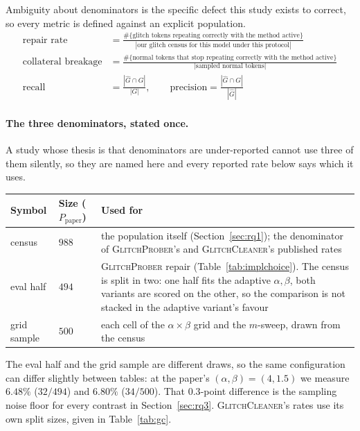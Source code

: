\documentclass[11pt,a4paper]{article}
\newcommand{\gp}{\textsc{GlitchProber}}
\newcommand{\gc}{\textsc{GlitchCleaner}}
\newcommand{\Ppaper}{$P_{\mathrm{paper}}$}
\begin{document}
Ambiguity about denominators is the specific defect this study exists to correct,
so every metric is defined against an explicit population.
\begin{align*}
\text{repair rate} &= \frac{\#\{\text{glitch tokens repeating correctly with the method active}\}}{|\text{our glitch census for this model under this protocol}|}\\[0.3em]
\text{collateral breakage} &= \frac{\#\{\text{normal tokens that stop repeating correctly with the method active}\}}{|\text{sampled normal tokens}|}\\[0.3em]
\text{recall} &= \frac{|\hat G \cap G|}{|G|},\qquad
\text{precision} = \frac{|\hat G \cap G|}{|\hat G|}
\end{align*}

\paragraph{The three denominators, stated once.} A study whose thesis is that
denominators are under-reported cannot use three of them silently, so they are
named here and every reported rate below says which it uses.

\begin{center}
\begin{tabular}{llp{7.6cm}}
\toprule
Symbol & Size (\Ppaper{}) & Used for \\
\midrule
census        & $988$ & the population itself (Section~\ref{sec:rq1}); the
                        denominator of \gp{}'s and \gc{}'s published rates \\
eval half     & $494$ & \gp{} repair (Table~\ref{tab:implchoice}). The census is
                        split in two: one half fits the adaptive $\alpha,\beta$,
                        both variants are scored on the other, so the comparison
                        is not stacked in the adaptive variant's favour \\
grid sample   & $500$ & each cell of the $\alpha \times \beta$ grid and the
                        $m$-sweep, drawn from the census \\
\bottomrule
\end{tabular}
\end{center}

\noindent The eval half and the grid sample are different draws, so the same
configuration can differ slightly between tables: at the paper's
$(\alpha,\beta) = (4, 1.5)$ we measure $6.48\%$ ($32/494$) and $6.80\%$
($34/500$). That $0.3$-point difference is the sampling noise floor for every
contrast in Section~\ref{sec:rq3}. \gc{}'s rates use its own split sizes, given in
Table~\ref{tab:gc}.
\end{document}
